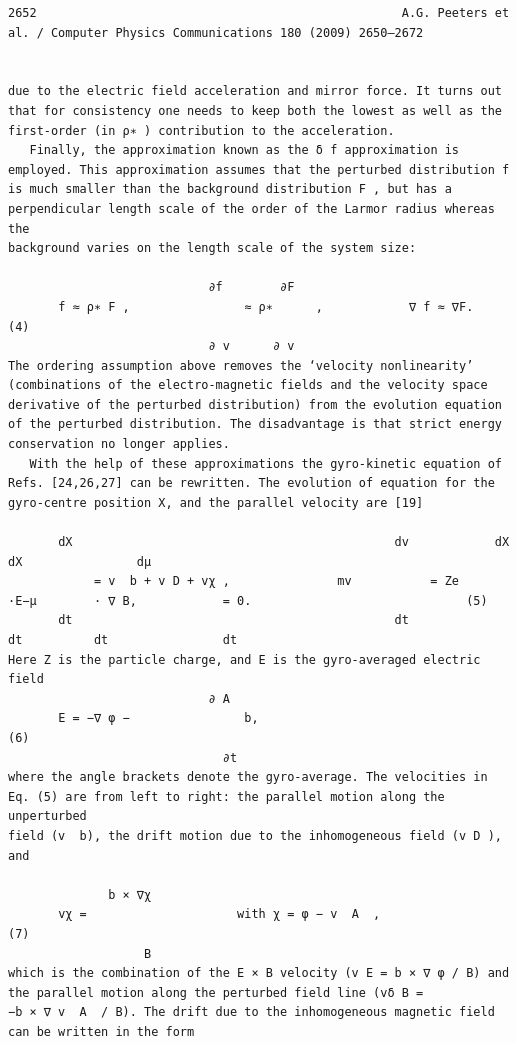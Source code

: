 \documentclass[a4paper]{article}
\newcommand{\gkwpagefont}{\fontsize{6.0pt}{7.55pt}\selectfont}
\begin{document}
\begin{Verbatim}[fontsize=\gkwpagefont]
2652                                                   A.G. Peeters et al. / Computer Physics Communications 180 (2009) 2650–2672


due to the electric field acceleration and mirror force. It turns out that for consistency one needs to keep both the lowest as well as the
first-order (in ρ∗ ) contribution to the acceleration.
   Finally, the approximation known as the δ f approximation is employed. This approximation assumes that the perturbed distribution f
is much smaller than the background distribution F , but has a perpendicular length scale of the order of the Larmor radius whereas the
background varies on the length scale of the system size:

                            ∂f        ∂F
       f ≈ ρ∗ F ,                ≈ ρ∗      ,            ∇ f ≈ ∇F.                                                                         (4)
                            ∂ v      ∂ v
The ordering assumption above removes the ‘velocity nonlinearity’ (combinations of the electro-magnetic fields and the velocity space
derivative of the perturbed distribution) from the evolution equation of the perturbed distribution. The disadvantage is that strict energy
conservation no longer applies.
   With the help of these approximations the gyro-kinetic equation of Refs. [24,26,27] can be rewritten. The evolution of equation for the
gyro-centre position X, and the parallel velocity are [19]

       dX                                             dv            dX          dX                dμ
            = v  b + v D + vχ ,               mv           = Ze         ·E−μ        · ∇ B,            = 0.                              (5)
       dt                                             dt             dt          dt                dt
Here Z is the particle charge, and E is the gyro-averaged electric field
                            ∂ A
       E = −∇ φ −                b,                                                                                                       (6)
                              ∂t
where the angle brackets denote the gyro-average. The velocities in Eq. (5) are from left to right: the parallel motion along the unperturbed
field (v  b), the drift motion due to the inhomogeneous field (v D ), and

              b × ∇χ
       vχ =                     with χ = φ − v  A  ,                                                                                    (7)
                   B
which is the combination of the E × B velocity (v E = b × ∇ φ / B) and the parallel motion along the perturbed field line (vδ B =
−b × ∇ v  A  / B). The drift due to the inhomogeneous magnetic field can be written in the form
                                   

\end{Verbatim}
\end{document}

